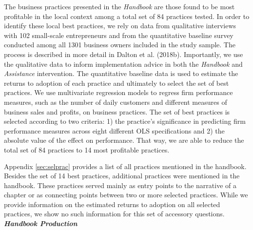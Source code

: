 \documentclass[11.5pt]{article}
\begin{document}
The business practices presented in the \emph{Handbook} are those found to be most profitable in the local context among a total set of 84 practices tested. In order to identify these local best practices, we rely on data from qualitative interviews with 102 small-scale entrepreneurs and from the quantitative baseline survey conducted among all 1301 business owners included in the study sample. The process is described in more detail in Dalton et al. (2018b). Importantly, we use the qualitative data to inform implementation advice in both the \emph{Handbook} and \emph{Assistance} intervention. The quantitative baseline data is used to estimate the returns to adoption of each practice and ultimately to select the set of best practices. We use multivariate regression models to regress firm performance measures, such as the number of daily customers and different measures of business sales and profits, on business practices. The set of best practices is selected according to two criteria: 1) the practice's significance in predicting firm performance measures across eight different OLS specifications and 2) the absolute value of the effect on performance. That way, we are able to reduce the total set of 84 practices to 14 most profitable practices. %

Appendix \ref{sec:selprac} provides a list of all practices mentioned in the handbook. Besides the set of 14 best practices, additional practices were mentioned in the handbook. These practices served mainly as entry points to the narrative of a chapter or as connecting points between two or more selected practices. While we provide information on the estimated returns to adoption on all selected practices, we show no such information for this set of accessory questions. \\

\noindent \emph{\textbf{Handbook Production}}\
\end{document}

